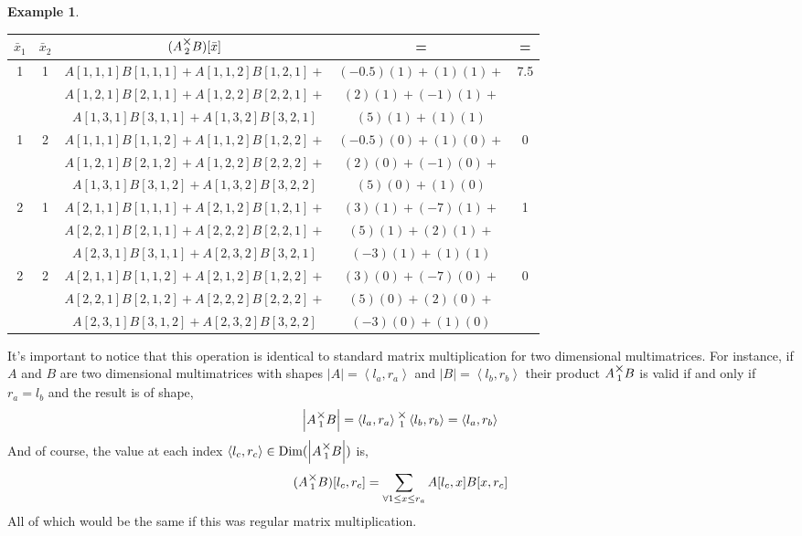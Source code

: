 \documentclass[12pt]{book}
\theoremstyle{plain}
\theoremstyle{definition}
\newtheorem{example}{Example}[chapter]
\theoremstyle{ppart}
\theoremstyle{case}
\theoremstyle{solution}
\DeclareMathOperator{\Dim}{Dim}
\newcommand{\mmult}[1]{\text{\raisebox{1ex}{$\underset{#1}{\times}$}}}
\newcommand{\shape}[1]{\left|#1\right|}
\begin{document}
\begin{example}
\begin{table}[h!]
\begin{center}
\begin{tabular}{c c | c | c | c}
$\bar{x}_1$ & $\bar{x}_2$ & $(A \mmult{2} B)[\bar{x}]$ & = & = \\
\hline
1 & 1 &
  $A[1,1,1]B[1,1,1] + A[1,1,2]B[1,2,1] +$ & $(-0.5)(1) + (1)(1) +$ & 7.5 \\
&&$A[1,2,1]B[2,1,1] + A[1,2,2]B[2,2,1] +$ & $(2)(1) + (-1)(1) +$ & \\
&&$A[1,3,1]B[3,1,1] + A[1,3,2]B[3,2,1]$   & $(5)(1) + (1)(1)$ & \\
1 & 2 &
  $A[1,1,1]B[1,1,2] + A[1,1,2]B[1,2,2] +$ & $(-0.5)(0) + (1)(0) +$ & 0 \\
&&$A[1,2,1]B[2,1,2] + A[1,2,2]B[2,2,2] +$ & $(2)(0) + (-1)(0) +$ & \\
&&$A[1,3,1]B[3,1,2] + A[1,3,2]B[3,2,2]$   & $(5)(0) + (1)(0)$ & \\
2 & 1 &
  $A[2,1,1]B[1,1,1] + A[2,1,2]B[1,2,1] +$ & $(3)(1) + (-7)(1) +$ & 1 \\
&&$A[2,2,1]B[2,1,1] + A[2,2,2]B[2,2,1] +$ & $(5)(1) + (2)(1) +$ & \\
&&$A[2,3,1]B[3,1,1] + A[2,3,2]B[3,2,1]$   & $(-3)(1) + (1)(1)$ & \\
2 & 2 &
  $A[2,1,1]B[1,1,2] + A[2,1,2]B[1,2,2] +$ & $(3)(0) + (-7)(0) +$ & 0 \\
&&$A[2,2,1]B[2,1,2] + A[2,2,2]B[2,2,2] +$ & $(5)(0) + (2)(0) +$ & \\
&&$A[2,3,1]B[3,1,2] + A[2,3,2]B[3,2,2]$   & $(-3)(0) + (1)(0)$ &
\end{tabular}
\end{center}
\end{table}

\end{example}
\newpage

It's important to notice that this operation is identical to standard
matrix multiplication for two dimensional multimatrices. For instance,
if $A$ and $B$ are two dimensional multimatrices with shapes
$\shape{A} = \left<l_a, r_a\right>$ and $\shape{B} = \left<l_b, r_b\right>$
their product $A \mmult{1} B$ is valid if and only if $r_a = l_b$ and
the result is of shape,
\[ \shape{A \mmult{1} B} = \left<l_a, r_a\right> \mmult{1} \left<l_b, r_b\right> = \left<l_a, r_b\right> \]
And of course, the value at each index
$\left<l_c, r_c\right> \in \Dim(\shape{A \mmult{1} B})$ is,
\[
  (A \mmult{1} B)[l_c, r_c]
  =
  \sum_{\forall 1 \le x \le r_a} 
  A[l_c, x] B[x, r_c]
\]
All of which would be the same if this was regular matrix multiplication.
\end{document}
